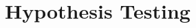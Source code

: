 \documentclass[aspectratio=169,11pt]{beamer}
\begin{document}
%		
%
%
%
%	
%	
%
%
%



\section{Hypothesis Testing}
\end{document}
